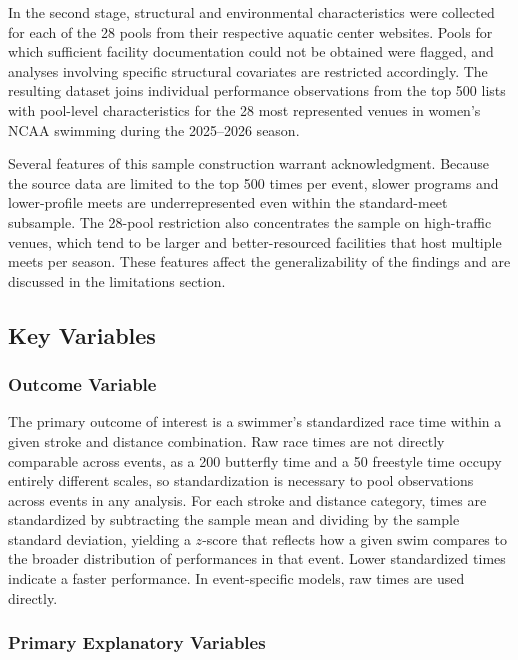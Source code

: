\documentclass[12pt]{article}
\begin{document}
In the second stage, structural and environmental characteristics were collected
for each of the 28 pools from their respective aquatic center websites. Pools
for which sufficient facility documentation could not be obtained were flagged,
and analyses involving specific structural covariates are restricted
accordingly. The resulting dataset joins individual performance observations
from the top 500 lists with pool-level characteristics for the 28 most
represented venues in women's NCAA swimming during the 2025--2026 season.

Several features of this sample construction warrant acknowledgment. Because
the source data are limited to the top 500 times per event, slower programs and
lower-profile meets are underrepresented even within the standard-meet
subsample. The 28-pool restriction also concentrates the sample on high-traffic
venues, which tend to be larger and better-resourced facilities that host
multiple meets per season. These features affect the generalizability of the
findings and are discussed in the limitations section.

\subsection{Key Variables}

\subsubsection{Outcome Variable}

The primary outcome of interest is a swimmer's standardized race time within a
given stroke and distance combination. Raw race times are not directly
comparable across events, as a 200 butterfly time and a 50 freestyle time
occupy entirely different scales, so standardization is necessary to pool
observations across events in any analysis. For each stroke and distance
category, times are standardized by subtracting the sample mean and dividing by
the sample standard deviation, yielding a $z$-score that reflects how a given
swim compares to the broader distribution of performances in that event. Lower
standardized times indicate a faster performance. In event-specific models, raw
times are used directly.

\subsubsection{Primary Explanatory Variables}
\end{document}
